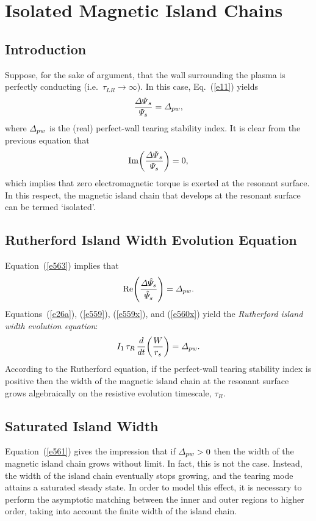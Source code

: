 \documentclass[12pt,prb,aps]{revtex4-1}
\begin{document}
\section{Isolated Magnetic Island Chains}
\subsection{Introduction}
Suppose, for the sake of argument,  that the wall surrounding the plasma is perfectly conducting (i.e.\, $\tau_{LR}\rightarrow\infty$). In this case, Eq.~(\ref{e11}) yields 
\begin{equation}\label{e563}
\frac{{\mit\Delta\Psi}_s}{{\mit\Psi}_s} ={\mit\Delta}_{pw},
\end{equation}
where ${\mit\Delta}_{pw}$ is the (real) perfect-wall tearing stability index. It is clear from the previous equation that
\begin{equation}\label{e559x}
{\rm Im}\!\left(\frac{{\mit\Delta\Psi}_s}{{\mit\Psi}_s}\right) = 0,
\end{equation}
which implies that zero electromagnetic torque is exerted at the resonant surface. In this respect, the magnetic island chain that develops at the resonant surface can be termed `isolated'. 

\subsection{Rutherford Island Width Evolution Equation}
Equation~(\ref{e563}) implies that 
\begin{equation}\label{e560x}
{\rm Re}\!\left(\frac{{\mit\Delta}\hat{\mit\Psi}_s}{\hat{\mit\Psi}_s}\right) = {\mit\Delta}_{pw}.
\end{equation}
Equations~(\ref{e26a}), (\ref{e559}), (\ref{e559x}), and (\ref{e560x}) yield the {\em Rutherford island width evolution equation}:\,\cite{rutherford}
\begin{equation}\label{e561}
I_1\,\tau_R\,\frac{d}{dt}\!\left(\frac{W}{r_s}\right)= {\mit\Delta}_{pw}.
\end{equation}
 According to the Rutherford equation, if the perfect-wall tearing stability index is positive then the width of the magnetic
island chain at the resonant surface grows  algebraically on the resistive evolution timescale, $\tau_R$. 

\subsection{Saturated Island Width}\label{sat}
Equation~(\ref{e561}) gives the impression that if ${\mit\Delta}_{pw}>0$ then the width of the magnetic island chain 
grows without limit. In fact, this is not the case. Instead, the width of the island chain eventually stops growing, and the
tearing mode attains a saturated steady state. In order to model this effect, it is necessary to perform the
asymptotic matching between the inner and outer regions to higher order, taking into account the finite
width of the island chain.\cite{white,thy,esc,mit}
\end{document}
